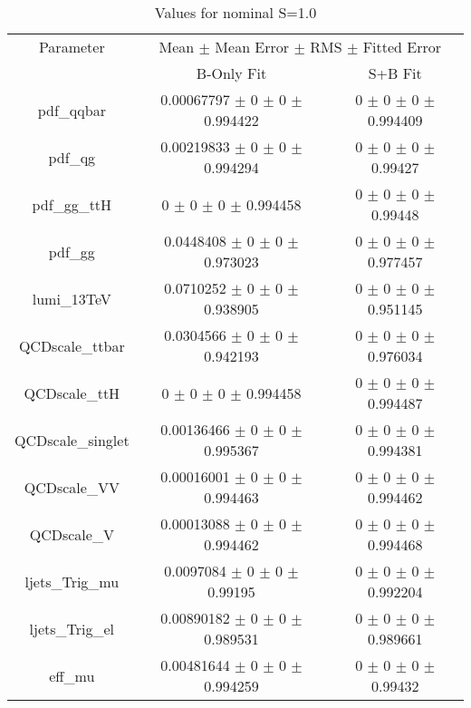 \begin{table}
\centering
\caption{Values for nominal S=1.0}
\begin{tabular}{ccc}
\toprule
Parameter & \multicolumn{2}{c}{Mean $\pm$ Mean Error $\pm$ RMS $\pm$ Fitted Error}\\
 & B-Only Fit & S+B Fit\\
\midrule
pdf\_qqbar & \num{0.00067797} $\pm$ \num{0} $\pm$ \num{0} $\pm$ \num{0.994422} & \num{0} $\pm$ \num{0} $\pm$ \num{0} $\pm$ \num{0.994409}\\
pdf\_qg & \num{0.00219833} $\pm$ \num{0} $\pm$ \num{0} $\pm$ \num{0.994294} & \num{0} $\pm$ \num{0} $\pm$ \num{0} $\pm$ \num{0.99427}\\
pdf\_gg\_ttH & \num{0} $\pm$ \num{0} $\pm$ \num{0} $\pm$ \num{0.994458} & \num{0} $\pm$ \num{0} $\pm$ \num{0} $\pm$ \num{0.99448}\\
pdf\_gg & \num{0.0448408} $\pm$ \num{0} $\pm$ \num{0} $\pm$ \num{0.973023} & \num{0} $\pm$ \num{0} $\pm$ \num{0} $\pm$ \num{0.977457}\\
lumi\_13TeV & \num{0.0710252} $\pm$ \num{0} $\pm$ \num{0} $\pm$ \num{0.938905} & \num{0} $\pm$ \num{0} $\pm$ \num{0} $\pm$ \num{0.951145}\\
QCDscale\_ttbar & \num{0.0304566} $\pm$ \num{0} $\pm$ \num{0} $\pm$ \num{0.942193} & \num{0} $\pm$ \num{0} $\pm$ \num{0} $\pm$ \num{0.976034}\\
QCDscale\_ttH & \num{0} $\pm$ \num{0} $\pm$ \num{0} $\pm$ \num{0.994458} & \num{0} $\pm$ \num{0} $\pm$ \num{0} $\pm$ \num{0.994487}\\
QCDscale\_singlet & \num{0.00136466} $\pm$ \num{0} $\pm$ \num{0} $\pm$ \num{0.995367} & \num{0} $\pm$ \num{0} $\pm$ \num{0} $\pm$ \num{0.994381}\\
QCDscale\_VV & \num{0.00016001} $\pm$ \num{0} $\pm$ \num{0} $\pm$ \num{0.994463} & \num{0} $\pm$ \num{0} $\pm$ \num{0} $\pm$ \num{0.994462}\\
QCDscale\_V & \num{0.00013088} $\pm$ \num{0} $\pm$ \num{0} $\pm$ \num{0.994462} & \num{0} $\pm$ \num{0} $\pm$ \num{0} $\pm$ \num{0.994468}\\
ljets\_Trig\_mu & \num{0.0097084} $\pm$ \num{0} $\pm$ \num{0} $\pm$ \num{0.99195} & \num{0} $\pm$ \num{0} $\pm$ \num{0} $\pm$ \num{0.992204}\\
ljets\_Trig\_el & \num{0.00890182} $\pm$ \num{0} $\pm$ \num{0} $\pm$ \num{0.989531} & \num{0} $\pm$ \num{0} $\pm$ \num{0} $\pm$ \num{0.989661}\\
eff\_mu & \num{0.00481644} $\pm$ \num{0} $\pm$ \num{0} $\pm$ \num{0.994259} & \num{0} $\pm$ \num{0} $\pm$ \num{0} $\pm$ \num{0.99432}\\

\end{tabular}
\end{table}
